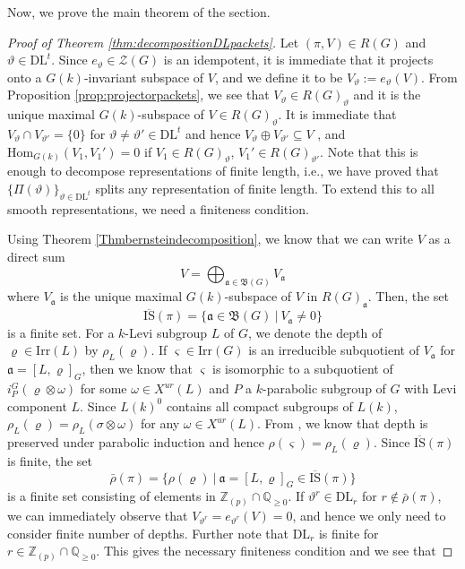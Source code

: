 \documentclass[11 pt]{article}
\numberwithin{equation}{subsection}
\theoremstyle{definition}
\theoremstyle{remark}
\theoremstyle{conjecture}
\newcommand{\Irr}{\mathrm{Irr}}
\newcommand{\DL}{\mathrm{DL}}
\newcommand{\Hom}{\mathrm{Hom}}
\newcommand{\IS}{\mathrm{IS}}
\newcommand{\Z}{\mathbb Z}
\newcommand{\Q}{\mathbb Q}
\newcommand{\mf}{\mathfrak}
\newcommand{\ZZ}{\mathcal{Z}}
\begin{document}
Now, we prove the main theorem of the section. 
\begin{proof}[Proof of Theorem \ref{thm:decompositionDLpackets}]
    Let $(\pi, V)\in R(G)$ and $\vartheta \in \DL^t$. Since $e_{\vartheta}\in \ZZ(G)$ is an idempotent, it is immediate that it projects onto a  $G(k)$-invariant subspace of $V$, and we define it to be $V_\vartheta := e_{\vartheta}(V)$. From Proposition \ref{prop:projectorpackets}, we see that $V_\vartheta\in R(G)_\vartheta$ and it is the unique maximal $G(k)$-subspace of $V\in R(G)_\vartheta$. It is immediate that $V_\vartheta \cap V_{\vartheta'}=\{0\}$ for $\vartheta\neq \vartheta' \in \DL^t$ and hence $V_\vartheta \oplus V_{\vartheta'} \subseteq V $ , and $\Hom_{G(k)}(V_1,V_1')=0$ if $V_1\in R(G)_\vartheta$, $V_1'\in R(G)_{\vartheta'}$. Note that this is enough to decompose representations of finite length, i.e., we have proved that $\{\Pi(\vartheta )\}_{\vartheta \in \DL^t}$ splits any representation of finite length. To extend this to all smooth representations, we need a finiteness condition. \par
    Using Theorem \ref{Thmbernsteindecomposition}, we know that we can write $V$ as a direct sum 
    \begin{equation*}
        V = \bigoplus_{\mf a \in \mf B(G)} V_{\mf a}
    \end{equation*}
    where $V_{\mf a}$ is the unique maximal $G(k)$-subspace of $V$ in $R(G)_{\mf a}$. Then, the set 
    $$\overline{\IS}(\pi)= \{ \mf a \in \mf B(G)\:|\: V_{\mf a} \neq 0\} $$
    is a finite set. For a $k$-Levi subgroup $L$ of $G$, we denote the depth of $\varrho \in \Irr(L)$ by $\rho_L(\varrho)$.   If $\varsigma\in \Irr(G) $ is an irreducible subquotient of $V_{\mf a}$ for $\mf a = [L,\varrho]_G$, then we know that $\varsigma $ is isomorphic to a subquotient of $i_P^G(\varrho \otimes \omega)$ for some $\omega \in X^{ur}(L)$ and $P$ a $k$-parabolic subgroup of $G$ with Levi component $L$. Since $L(k)^0$ contains all compact subgroups of $L(k)$, $\rho_L(\varrho)= \rho_L(\sigma \otimes \omega)$ for any $\omega \in X^{ur}(L)$. From \cite[Theorem 5.2]{MP96}, we know that depth is preserved under parabolic induction and hence $\rho(\varsigma)= \rho_L(\varrho)$. Since $\overline{\IS}(\pi)$ is finite, the set 
    $$\bar\rho(\pi)=\{ \rho(\varrho)\:|\: \mf a = [L,\varrho]_G \in \overline{\IS}(\pi)\}$$
    is a finite set consisting of elements in $\Z_{(p)}\cap \Q_{\geq 0}$. If $\vartheta^r \in \DL_r$ for $r \not \in \bar\rho(\pi)$, we can immediately observe that $V_{\vartheta^r} = e_{\vartheta^r}(V)=0$, and hence we only need to consider finite number of depths. Further note that $\DL_r$ is finite for $r \in \Z_{(p)}\cap \Q_{\geq 0}$. This gives the necessary finiteness condition and we see that 

\end{proof}
\end{document}
